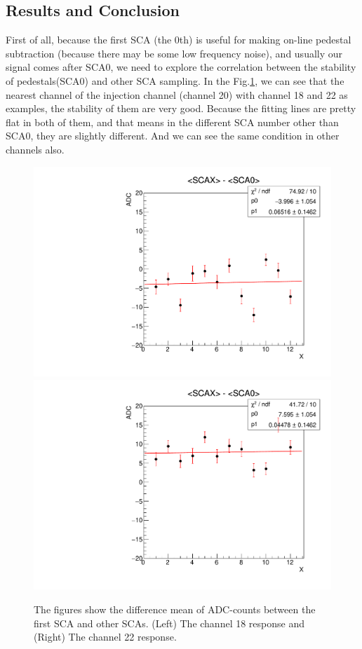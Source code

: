 \subsection{Results and Conclusion}
First of all, because the first SCA (the 0th) is useful for making on-line pedestal subtraction (because there may be some low frequency noise), and usually our signal comes after SCA0, we need to explore the correlation between the stability of pedestals(SCA0) and other SCA sampling.  In the Fig.\ref{fig:PCB_Stability}, we can see that the nearest channel of the injection channel (channel 20) with channel 18 and 22 as examples, the stability of them are very good. Because the fitting lines are pretty flat in both of them, and that means in the different SCA number other than SCA0, they are slightly different. And we can see the same condition in other channels also.

\begin{figure}[!htb]
\centering
     \includegraphics[width=\cmsFigWidth]{PCB_study/HG_Chip0_channel18_Subtract_mean_Stability.pdf}
     \includegraphics[width=\cmsFigWidth]{PCB_study/HG_Chip0_channel22_Subtract_mean_Stability.pdf}\\
\caption{The figures show the difference mean of ADC-counts between the first SCA and other SCAs. (Left) The channel 18 response and (Right) The channel 22 response.
}
\label{fig:PCB_Stability}
\end{figure}

